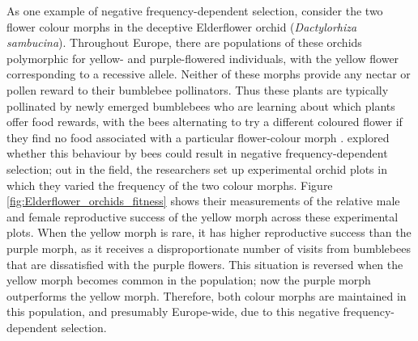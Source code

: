 {\begin{marginfigure}
\end{marginfigure}
As one example of negative frequency-dependent selection, consider the two flower colour morphs in the
deceptive Elderflower orchid ({\it Dactylorhiza
  sambucina}). Throughout Europe, there are populations of these orchids polymorphic for 
yellow- and purple-flowered individuals, with the
yellow flower corresponding to a recessive allele. %
 Neither of
these morphs provide any nectar or pollen reward to their bumblebee
pollinators. 
Thus these plants are typically pollinated by newly emerged
bumblebees who are learning about which plants offer food rewards,
with the bees alternating to try a different coloured flower if they
find no food associated with a particular flower-colour morph \citep{smithson1997negative}. 
\citet{gigord2001negative} explored whether this behaviour by bees
could result in negative frequency-dependent selection; out in the field, the researchers set up
experimental orchid plots in which they varied
the frequency of the two colour morphs. Figure \ref{fig:Elderflower_orchids_fitness} shows their measurements of the relative
male and female reproductive success of the yellow morph across these experimental plots. When the yellow morph is rare, it has
higher reproductive success than the purple morph, as it receives a
disproportionate number of visits from bumblebees that are dissatisfied
with the purple flowers. This situation is reversed when the yellow
morph becomes common in the population; now the purple morph
outperforms the yellow morph. Therefore, both colour morphs are
maintained in this population, and presumably Europe-wide, due to this negative frequency-dependent
selection. %


}
